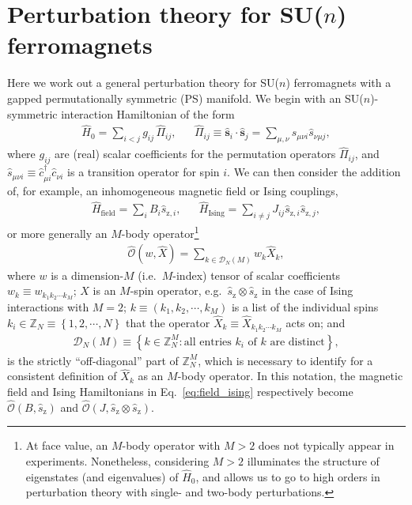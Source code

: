 \documentclass[aps,pra,nofootinbib,twocolumn,superscriptaddress]{revtex4-2}
\renewcommand{\t}{\text} %
\newcommand{\p}[1]{\left(#1\right)} %
\renewcommand{\set}[1]{\left\{#1\right\}} %
\renewcommand{\v}{\bm} %
\newcommand{\1}{\mathds{1}}
\renewcommand{\c}{\hat c}
\newcommand{\s}{\hat s}
\renewcommand{\H}{\hat H}
\renewcommand{\O}{\hat{\mathcal{O}}}
\newcommand{\z}{\text{z}}
\newcommand{\ZZ}{\mathbb{Z}}
\newcommand{\D}{\mathcal{D}}
\begin{document}

\onecolumngrid
\appendix

\section{Perturbation theory for SU($n$) ferromagnets}
\label{sec:pert_theory}

Here we work out a general perturbation theory for SU($n$) ferromagnets with a gapped permutationally symmetric (PS) manifold.
We begin with an SU($n$)-symmetric interaction Hamiltonian of the form
\begin{align}
  \H_0 = \sum_{i<j} g_{ij} \, \hat\Pi_{ij},
  &&
  \hat\Pi_{ij} \equiv \v\s_i\cdot\v\s_j
  = \sum_{\mu,\nu} \s_{\mu\nu i} \s_{\nu\mu j},
  \label{eq:H_0}
\end{align}
where $g_{ij}$ are (real) scalar coefficients for the permutation operators $\hat\Pi_{ij}$, and $\s_{\mu\nu i}\equiv \c_{\mu i}^\dag \c_{\nu i}$ is a transition operator for spin $i$.
We can then consider the addition of, for example, an inhomogeneous magnetic field or Ising couplings,
\begin{align}
  \H_{\t{field}} = \sum_i B_i \s_{\z,i},
  &&
  \H_{\t{Ising}} = \sum_{i\ne j} J_{ij} \s_{\z,i} \s_{\z,j},
  \label{eq:field_ising}
\end{align}
or more generally an $M$-body operator\footnote{At face value, an $M$-body operator with $M>2$ does not typically appear in experiments.
Nonetheless, considering $M>2$ illuminates the structure of eigenstates (and eigenvalues) of $\H_0$, and allows us to go to high orders in perturbation theory with single- and two-body perturbations.}
\begin{align}
  \O(w,\hat X) = \sum_{k\in\D_N\p{M}} w_k \hat X_k,
\end{align}
where $w$ is a dimension-$M$ (i.e.~$M$-index) tensor of scalar
coefficients $w_k\equiv w_{k_1k_2\cdots k_M}$; $X$ is an $M$-spin
operator, e.g.~$\s_\z\otimes \s_\z$ in the case of Ising interactions
with $M=2$; $k\equiv\p{k_1,k_2,\cdots,k_M}$ is a list of the
individual spins $k_i\in\ZZ_N\equiv\set{1,2,\cdots,N}$ that the operator $\hat X_k\equiv \hat X_{k_1k_2\cdots k_M}$ acts on; and
\begin{align}
  \D_N\p{M} \equiv
  \set{ k \in \ZZ_N^M : \t{all entries $k_i$ of $k$ are distinct} },
\end{align}
is the strictly ``off-diagonal'' part of $\ZZ_N^M$, which is necessary to identify for a consistent definition of $\hat X_k$ as an $M$-body operator.
In this notation, the magnetic field and Ising Hamiltonians in Eq.~\eqref{eq:field_ising} respectively become $\O\p{B,\s_{\z}}$ and $\O\p{J,\s_\z\otimes \s_\z}$.
\end{document}
